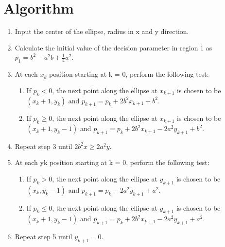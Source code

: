\documentclass[12pt]{article}
\begin{document}
	\section{Algorithm}
	\begin{enumerate}
		\item Input the center of the ellipse, radius in x and y direction.
		\item Calculate the initial value of the decision parameter in region 1 as $p_1 = b^2 - a^2b + \frac{1}{4}a^2$.
		\item At each $x_k$ position starting at k = 0, perform the following test:
		\begin{enumerate}
			\item If $p_k < 0$, the next point along the ellipse at $x_{k+1}$ is chosen to be $(x_k + 1, y_k)$ and $p_{k+1} = p_k + 2b^2x_{k+1} + b^2$.
			\item If $p_k \geq 0$, the next point along the ellipse at $x_{k+1}$ is chosen to be $(x_k + 1, y_k - 1)$ and $p_{k+1} = p_k + 2b^2x_{k+1} - 2a^2y_{k+1} + b^2$.
		\end{enumerate}
		\item Repeat step 3 until $2b^2x \geq 2a^2y$.
		\item At each yk position starting at k = 0, perform the following test:
		\begin{enumerate}
			\item If $p_k > 0$, the next point along the ellipse at $y_{k+1}$ is chosen to be $(x_k, y_k - 1)$ and $p_{k+1} = p_k - 2a^2y_{k+1} + a^2$.
			\item If $p_k \leq 0$, the next point along the ellipse at $y_{k+1}$ is chosen to be $(x_k + 1, y_k - 1)$ and $p_{k+1} = p_k + 2b^2x_{k+1} - 2a^2y_{k+1} + a^2$.
		\end{enumerate}
		\item Repeat step 5 until $y_{k+1} = 0$.
	\end{enumerate}

	\newpage
\end{document}

